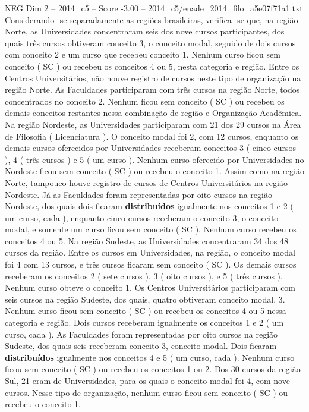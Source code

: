 \begin{textsample}{NEG Dim 2 – 2014\_c5 – Score -3.00 – 2014\_c5/enade\_2014\_filo\_a5e07f71a1.txt}
Considerando -se separadamente as regiões brasileiras, verifica -se que, na região Norte, as Universidades concentraram seis dos nove cursos participantes, dos quais três cursos obtiveram conceito 3, o conceito modal, seguido de dois cursos com conceito 2 e um curso que recebeu conceito 1.
Nenhum curso ficou sem conceito ( SC ) ou recebeu os conceitos 4 ou 5, nesta categoria e região.
Entre os Centros Universitários, não houve registro de cursos neste tipo de organização na região Norte.
As Faculdades participaram com três cursos na região Norte, todos concentrados no conceito 2.
Nenhum ficou sem conceito ( SC ) ou recebeu os demais conceitos restantes nessa combinação de região e Organização Acadêmica.
Na região Nordeste, as Universidades participaram com 21 dos 29 cursos na Área de Filosofia ( Licenciatura ).
O conceito modal foi 2, com 12 cursos, enquanto os demais cursos oferecidos por Universidades receberam conceitos 3 ( cinco cursos ), 4 ( três cursos ) e 5 ( um curso ).
Nenhum curso oferecido por Universidades no Nordeste ficou sem conceito ( SC ) ou recebeu o conceito 1.
Assim como na região Norte, tampouco houve registro de cursos de Centros Universitários na região Nordeste.
Já as Faculdades foram representadas por oito cursos na região Nordeste, dos quais dois ficaram \textbf{distribuídos} igualmente nos conceitos 1 e 2 ( um curso, cada ), enquanto cinco cursos receberam o conceito 3, o conceito modal, e somente um curso ficou sem conceito ( SC ).
Nenhum curso recebeu os conceitos 4 ou 5.
Na região Sudeste, as Universidades concentraram 34 dos 48 cursos da região.
Entre os cursos em Universidades, na região, o conceito modal foi 4 com 13 cursos, e três cursos ficaram sem conceito ( SC ).
Os demais cursos receberam os conceitos 2 ( sete cursos ), 3 ( oito cursos ), e 5 ( três cursos ).
Nenhum curso obteve o conceito 1.
Os Centros Universitários participaram com seis cursos na região Sudeste, dos quais, quatro obtiveram conceito modal, 3.
Nenhum curso ficou sem conceito ( SC ) ou recebeu os conceitos 4 ou 5 nessa categoria e região.
Dois cursos receberam igualmente os conceitos 1 e 2 ( um curso, cada ).
As Faculdades foram representadas por oito cursos na região Sudeste, dos quais seis receberam conceito 3, conceito modal.
Dois ficaram \textbf{distribuídos} igualmente nos conceitos 4 e 5 ( um curso, cada ).
Nenhum curso ficou sem conceito ( SC ) ou recebeu os conceitos 1 ou 2.
Dos 30 cursos da região Sul, 21 eram de Universidades, para os quais o conceito modal foi 4, com nove cursos.
Nesse tipo de organização, nenhum curso ficou sem conceito ( SC ) ou recebeu o conceito 1.

\end{textsample}

